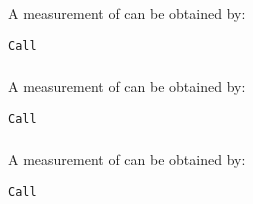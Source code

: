 A measurement of  can be obtained by:

\begin{lstlisting}[style=fortran]
Call 
\end{lstlisting}

\subsubsection{}

A measurement of  can be obtained by:

\begin{lstlisting}[style=fortran]
Call 
\end{lstlisting}

\subsubsection{}

A measurement of  can be obtained by:

\begin{lstlisting}[style=fortran]
Call 
\end{lstlisting}
